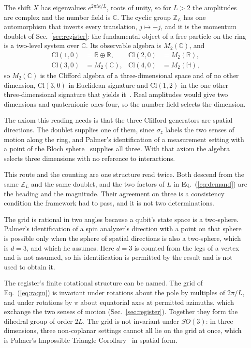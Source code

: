\documentclass[aps,prd,twocolumn,superscriptaddress,nofootinbib]{revtex4-2}
\begin{document}
The shift $X$ has eigenvalues $e^{2\pi i\kappa/L}$, roots of unity, so for $L > 2$ the amplitudes are complex and the number field is $\mathbb{C}$. The cyclic group $\mathbb{Z}_L$ has one automorphism that inverts every translation, $j \mapsto -j$, and it is the momentum doublet of Sec.~\ref{sec:register}: the fundamental object of a free particle on the ring is a two-level system over $\mathbb{C}$. Its observable algebra is $M_2(\mathbb{C})$, and
\begin{align}
\mathrm{Cl}(1,0) &= \mathbb{R}\oplus\mathbb{R}, & \mathrm{Cl}(2,0) &= M_2(\mathbb{R}), \nonumber\\
\mathrm{Cl}(3,0) &= M_2(\mathbb{C}), & \mathrm{Cl}(4,0) &= M_2(\mathbb{H}),
\label{eq:clifford}
\end{align}
so $M_2(\mathbb{C})$ is the Clifford algebra of a three-dimensional space and of no other dimension, $\mathrm{Cl}(3,0)$ in Euclidean signature and $\mathrm{Cl}(1,2)$ in the one other three-dimensional signature that yields it~\cite{lounesto2001}. Real amplitudes would give two dimensions and quaternionic ones four, so the number field selects the dimension.

The axiom this reading needs is that the three Clifford generators are spatial directions. The doublet supplies one of them, since $\sigma_z$ labels the two senses of motion along the ring, and Palmer's identification of a measurement setting with a point of the Bloch sphere~\cite{palmer2020,palmer2026c} supplies all three. With that axiom the algebra selects three dimensions with no reference to interactions.

This route and the counting are one structure read twice. Both descend from the same $\mathbb{Z}_L$ and the same doublet, and the two factors of $L$ in Eq.~(\ref{eq:demand}) are the heading and the magnitude. Their agreement on three is a consistency condition the framework had to pass, and it is not two determinations.

The grid is rational in two angles because a qubit's state space is a two-sphere. Palmer's identification of a spin analyzer's direction with a point on that sphere is possible only when the sphere of spatial directions is also a two-sphere, which is $d = 3$, and which he assumes. Here $d = 3$ is counted from the legs of a vertex and is not assumed, so his identification is permitted by the result and is not used to obtain it.

The register's finite rotational structure can be named. The grid of Eq.~(\ref{eq:raqm}) is invariant under rotations about the pole by multiples of $2\pi/L$, and under rotations by $\pi$ about equatorial axes at permitted azimuths, which exchange the two senses of motion (Sec.~\ref{sec:register}). Together they form the dihedral group of order $2L$. The grid is not invariant under $SO(3)$: in three dimensions, three non-coplanar settings cannot all lie on the grid at once, which is Palmer's Impossible Triangle Corollary~\cite{palmer2026b,palmer2026c} in spatial form.
\end{document}
